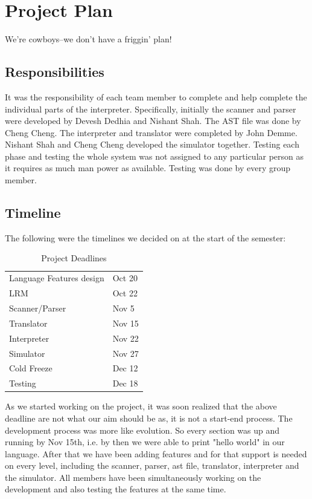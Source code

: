 \documentclass[onecolumn,titlepage]{article}
\begin{document}
\section{Project Plan}

We're cowboys--we don't have a friggin' plan!

\subsection{Responsibilities}

It was the responsibility of each team member to complete and help
complete the individual parts of the interpreter. Specifically,
initially the scanner and parser were developed by Devesh Dedhia and
Nishant Shah. The AST file was done by Cheng Cheng. The interpreter
and translator were completed by John Demme. Nishant Shah and Cheng
Cheng developed the simulator together. Testing each phase and testing
the whole system was not assigned to any particular person as it
requires as much man power as available. Testing was done by every
group member.

\subsection{Timeline}

The following were the timelines we decided on at the start of the
semester:

\begin{table}[h]
\caption{Project Deadlines}
\begin{center}
  \begin{tabular}{|l|l|}
    \hline
    Language Features design	& Oct 20 \\
    LRM				& Oct 22 \\
    Scanner/Parser		& Nov 5  \\
    Translator			& Nov 15 \\
    Interpreter			& Nov 22 \\
    Simulator			& Nov 27 \\
    Cold Freeze			& Dec 12 \\
    Testing                     & Dec 18 \\
    \hline
  \end{tabular}
\end{center}
\end{table}

As we started working on the project, it was soon realized that the
above deadline are not what our aim should be as, it is not a
start-end process. The development process was more like evolution. So
every section was up and running by Nov 15th, i.e. by then we were
able to print "hello world" in our language. After that we have been
adding features and for that support is needed on every level,
including the scanner, parser, ast file, translator, interpreter and
the simulator.  All members have been simultaneously working on the
development and also testing the features at the same time.
\end{document}
